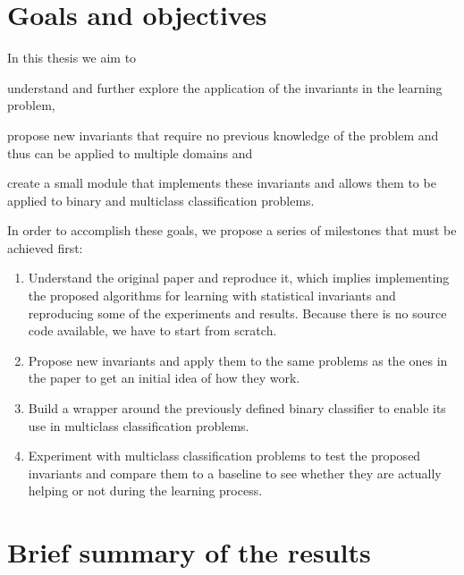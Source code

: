 \section{Goals and objectives}

In this thesis we aim to
\begin{enumerate*}[label=(\roman*)]
    \item understand and further explore the application of the invariants in the learning
    problem,
    \item propose new invariants that require no previous knowledge of the problem and
    thus can be applied to multiple domains and
    \item create a small module that implements these invariants and allows them
    to be applied to binary and multiclass classification problems.
\end{enumerate*}

In order to accomplish these goals, we propose a series of milestones that must be achieved
first:

\begin{enumerate}
    \item Understand the original paper and reproduce it, which implies implementing the proposed
    algorithms for learning with statistical invariants and reproducing some of the experiments
    and results. Because there is no source code available, we have to start from scratch.
    \item Propose new invariants and apply them to the same problems as the ones in the paper
    to get an initial idea of how they work.
    \item Build a wrapper around the previously defined binary classifier to enable its use
    in multiclass classification problems.
    \item Experiment with multiclass classification problems to test the proposed invariants and
    compare them to a baseline to see whether they are actually helping or not during the learning
    process.
\end{enumerate}



\section{Brief summary of the results}

